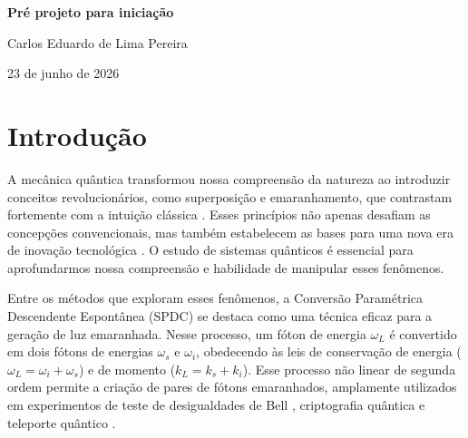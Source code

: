 \documentclass[brazil,12pt,a4paper,openany]{article}
\begin{document}
\setlength{\abovecaptionskip}{0.0cm}
\setlength{\belowcaptionskip}{0.0cm}

\pagestyle{fancy}
\lhead{}
\chead{}
\rhead{\thepage}
\lfoot{}
\cfoot{}
\rfoot{}

{
	\fancyhf{}
	\lhead{}
	\chead{}
	\rhead{\thepage}
	\lfoot{}
	\cfoot{}
	\rfoot{}
}

\renewcommand{\headrulewidth}{0pt}






\begin{center}

{\Large \bf Pré projeto para iniciação  }

\vspace{15pt}

{\large  Carlos Eduardo de Lima Pereira}

\end{center}
\begin{center}
23 de junho de 2026
\end{center}


\section{Introdução}
\label{intro2}
A mecânica quântica transformou nossa compreensão da natureza ao introduzir conceitos revolucionários, como superposição e emaranhamento, que contrastam fortemente com a intuição clássica \cite{feynman1965feynman,bell1964einstein}. Esses princípios não apenas desafiam as concepções convencionais, mas também estabelecem as bases para uma nova era de inovação tecnológica \cite{dowling2003quantum}. O estudo de sistemas quânticos é essencial para aprofundarmos nossa compreensão e habilidade de manipular esses fenômenos.

Entre os métodos que exploram esses fenômenos, a Conversão Paramétrica Descendente Espontânea (SPDC) se destaca como uma técnica eficaz para a geração de luz emaranhada. Nesse processo, um fóton de energia \(\omega_L\) é convertido em dois fótons de energias \(\omega_s\) e \(\omega_i\), obedecendo às leis de conservação de energia (\(\omega_L = \omega_i + \omega_s\)) e de momento (\(k_L = k_s + k_i\)). Esse processo não linear de segunda ordem permite a criação de pares de fótons emaranhados, amplamente utilizados em experimentos de teste de desigualdades de Bell \cite{weihs1998violation}, criptografia quântica \cite{jennewein2000quantum} e teleporte quântico \cite{bouwmeester1997experimental}.
\end{document}
